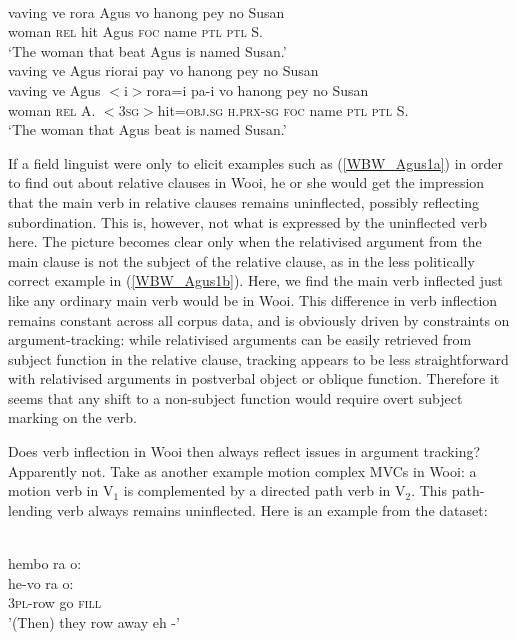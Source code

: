 \ea
{}\\
\ea \label{WBW_Agus1a}
\gll vaving ve rora Agus vo hanong pey no Susan \\
woman \textsc{rel} hit Agus \textsc{foc} name \textsc{ptl} \textsc{ptl} S. \\
\glft `The woman that beat Agus is named Susan.' \\ 
\ex \label{WBW_Agus1b}
\glll vaving ve Agus riorai pay vo hanong pey no Susan \\
vaving ve Agus $<$i$>$rora=i pa-i vo hanong pey no Susan \\
woman \textsc{rel} A. $<$3\textsc{sg}$>$hit=\textsc{obj}.\textsc{sg} \textsc{h}.\textsc{prx}-\textsc{sg} \textsc{foc} name \textsc{ptl} \textsc{ptl} S. \\
\glft `The woman that Agus beat is named Susan.' \\ 
\z
\z

If a field linguist were only to elicit examples such as (\ref{WBW_Agus1a}) in order to find out about relative clauses in Wooi, he or she would get the impression that the main verb in relative clauses remains uninflected, possibly reflecting subordination. This is, however, not what is expressed by the uninflected verb here. The picture becomes clear only when the relativised argument from the main clause is not the subject of the relative clause, as in the less politically correct example in (\ref{WBW_Agus1b}). Here, we find the main verb inflected just like any ordinary main verb would be in Wooi. This difference in verb inflection remains constant across all corpus data, and is obviously driven by constraints on argument-tracking: while relativised arguments can be easily retrieved from subject function in the relative clause, tracking appears to be less straightforward with relativised arguments in postverbal object or oblique function. Therefore it seems that any shift to a non-subject function would require overt subject marking on the verb.

Does verb inflection in Wooi then always reflect issues in argument tracking? Apparently not. Take as another example motion complex MVCs in Wooi: a motion verb in V$_1$ is complemented by a directed path verb in V$_2$. This path-lending verb always remains uninflected. Here is an example from the dataset:

\ea \label{}
\\
\glll hembo ra o: \\
he-vo ra o: \\
3\textsc{pl}-row go \textsc{fill} \\
\glft '(Then) they row away eh -'\\ 
\z

